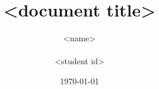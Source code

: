 \documentclass[11pt,a4paper,UKenglish]{memoir}
\title{<document title>}
\author{<name>\\
        \\
        <student id>
}
\date{\today}
\begin{document}
\frontmatter %


%
\tableofcontents
\listoffigures
\listoftables

\mainmatter %






\appendix %
\renewcommand{\appendixtocname}{Appendix} %
\addappheadtotoc %

\backmatter %
\end{document}
